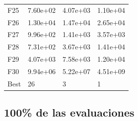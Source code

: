 \begin{table}[H]
\begin{minipage}{.5\linewidth}
\begin{tabular}{llll}
        F25  &  7.60e+02 &   4.07e+03 &  1.10e+04 \\
        F26  &  1.30e+04 &   1.47e+04 &  2.65e+04 \\
        F27  &  9.96e+02 &   1.41e+03 &  3.57e+03 \\
        F28  &  7.31e+02 &   3.67e+03 &  1.41e+04 \\
        F29  &  4.07e+03 &   7.58e+03 &  1.20e+04 \\
        F30  &  9.94e+06 &   5.22e+07 &  4.51e+09 \\
        Best &        26 &          3 &         1 \\
        \bottomrule
        \end{tabular}
        
    \end{minipage} 
\end{table}


\subsection*{100\% de las evaluaciones}

